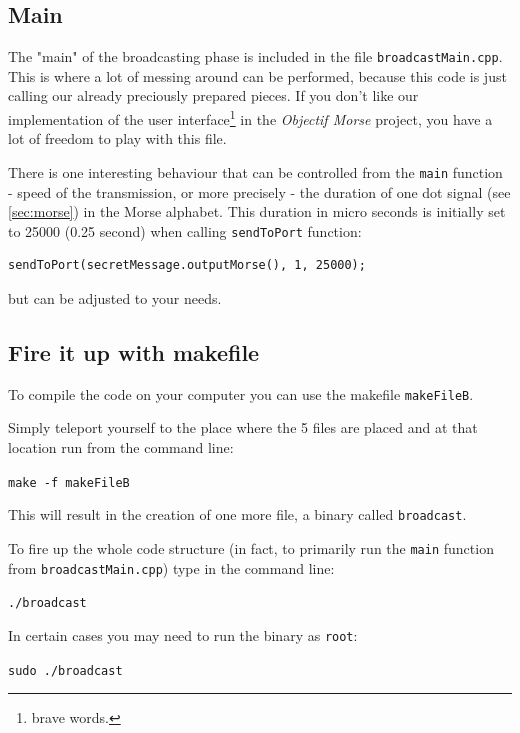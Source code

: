 \documentclass[12pt]{report}
\begin{document}
\subsection{Main}

The "main" of the broadcasting phase is included in the file \verb|broadcastMain.cpp|. This is where a lot of messing around can be performed, because this code is just calling our already preciously prepared pieces. If you don't like our implementation of the user interface\footnote{brave words.} in the \textit{Objectif Morse} project, you have a lot of freedom to play with this file.

There is one interesting behaviour that can be controlled from the \verb|main| function - speed of the transmission, or more precisely - the duration of one dot signal (see \ref{sec:morse}) in the Morse alphabet. This duration in micro seconds is initially set to 25000 (0.25 second) when calling \verb|sendToPort| function: 

\begin{lstlisting}
sendToPort(secretMessage.outputMorse(), 1, 25000);
\end{lstlisting}

but can be adjusted to your needs.

\subsection{Fire it up with makefile}

To compile the code on your computer you can use the makefile \verb|makeFileB|.

Simply teleport yourself to the place where the 5 files are placed and at that location run from the command line:

\begin{snugshade}
\verb|make -f makeFileB|
\end{snugshade}

This will result in the creation of one more file, a binary called \verb|broadcast|.

To fire up the whole code structure (in fact, to primarily run the \verb|main| function from \verb|broadcastMain.cpp|) type in the command line:

\begin{snugshade}
\verb|./broadcast|
\end{snugshade}


In certain cases you may need to run the binary as \verb|root|:

\begin{snugshade}
\verb|sudo ./broadcast|
\end{snugshade}
\end{document}
